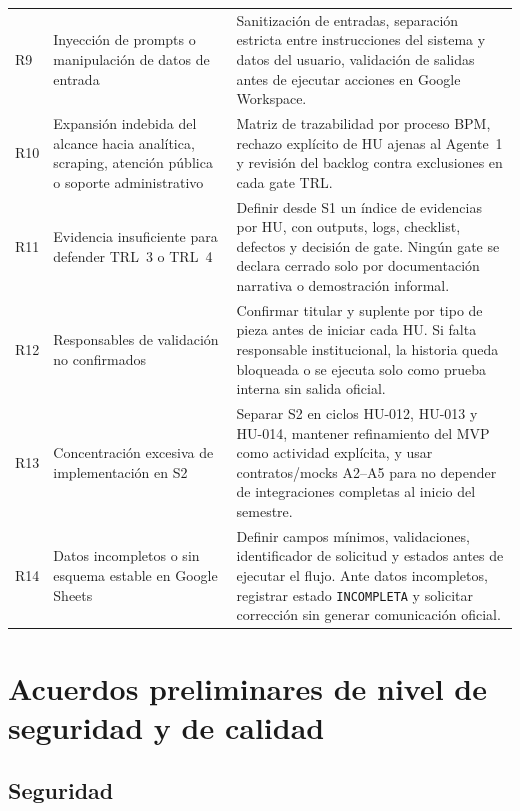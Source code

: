 \documentclass[a4paper, 12pt]{article}
\begin{document}
{\begin{longtable}{L{0.06\textwidth}L{0.42\textwidth}L{0.44\textwidth}}
    R9 & Inyecci\'on de prompts o manipulaci\'on de datos de entrada & Sanitizaci\'on de entradas, separaci\'on estricta entre instrucciones del sistema y datos del usuario, validaci\'on de salidas antes de ejecutar acciones en Google Workspace. \\
    R10 & Expansi\'on indebida del alcance hacia anal\'itica, scraping, atenci\'on p\'ublica o soporte administrativo & Matriz de trazabilidad por proceso BPM, rechazo expl\'icito de HU ajenas al Agente~1 y revisi\'on del backlog contra exclusiones en cada gate \ac{TRL}. \\
    R11 & Evidencia insuficiente para defender \ac{TRL}~3 o \ac{TRL}~4 & Definir desde S1 un \'indice de evidencias por \ac{HU}, con outputs, logs, checklist, defectos y decisi\'on de gate. Ning\'un gate se declara cerrado solo por documentaci\'on narrativa o demostraci\'on informal. \\
    R12 & Responsables de validaci\'on no confirmados & Confirmar titular y suplente por tipo de pieza antes de iniciar cada \ac{HU}. Si falta responsable institucional, la historia queda bloqueada o se ejecuta solo como prueba interna sin salida oficial. \\
    R13 & Concentraci\'on excesiva de implementaci\'on en S2 & Separar S2 en ciclos HU-012, HU-013 y HU-014, mantener refinamiento del \ac{MVP} como actividad expl\'icita, y usar contratos/mocks A2--A5 para no depender de integraciones completas al inicio del semestre. \\
    R14 & Datos incompletos o sin esquema estable en Google Sheets & Definir campos m\'inimos, validaciones, identificador de solicitud y estados antes de ejecutar el flujo. Ante datos incompletos, registrar estado \texttt{INCOMPLETA} y solicitar correcci\'on sin generar comunicaci\'on oficial. \\
    \bottomrule
\end{longtable}
}

\section{Acuerdos preliminares de nivel de seguridad y de calidad}

\subsection{Seguridad}
\end{document}
